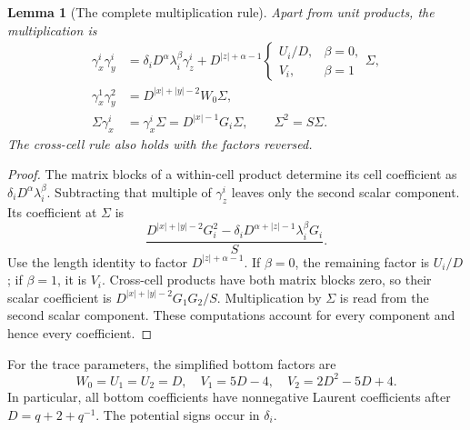 \documentclass[11pt]{article}
\newtheorem{lemma}[theorem]{Lemma}\newtheorem{corollary}[theorem]{Corollary}
\theoremstyle{definition}\newtheorem{definition}[theorem]{Definition}
\begin{document}
\begin{lemma}[The complete multiplication rule]\label{lem:table}
Apart from unit products, the multiplication is
\begin{align*}
 \gamma_x^i\gamma_y^i
 &=\delta_iD^\alpha\lambda_i^\beta\gamma_z^i
   +D^{|z|+\alpha-1}
      \begin{cases}U_i/D,&\beta=0,\\V_i,&\beta=1\end{cases}\Sigma,\\
 \gamma_x^1\gamma_y^2&=D^{|x|+|y|-2}W_0\Sigma,\\
 \Sigma\gamma_x^i&=\gamma_x^i\Sigma=D^{|x|-1}G_i\Sigma,
 \qquad \Sigma^2=S\Sigma.
\end{align*}
The cross-cell rule also holds with the factors reversed.
\end{lemma}
\begin{proof}
The matrix blocks of a within-cell product determine its cell coefficient as $\delta_iD^\alpha\lambda_i^\beta$. Subtracting that multiple of $\gamma_z^i$ leaves only the second scalar component. Its coefficient at $\Sigma$ is
\[
 \frac{D^{|x|+|y|-2}G_i^2
       -\delta_iD^{\alpha+|z|-1}\lambda_i^\beta G_i}{S}.
\]
Use the length identity to factor $D^{|z|+\alpha-1}$. If $\beta=0$, the remaining factor is $U_i/D$; if $\beta=1$, it is $V_i$. Cross-cell products have both matrix blocks zero, so their scalar coefficient is $D^{|x|+|y|-2}G_1G_2/S$. Multiplication by $\Sigma$ is read from the second scalar component. These computations account for every component and hence every coefficient.
\end{proof}

For the trace parameters, the simplified bottom factors are
\[
 W_0=U_1=U_2=D,\quad V_1=5D-4,\quad V_2=2D^2-5D+4.
\]
In particular, all bottom coefficients have nonnegative Laurent coefficients after $D=q+2+q^{-1}$. The potential signs occur in $\delta_i$.
\end{document}
